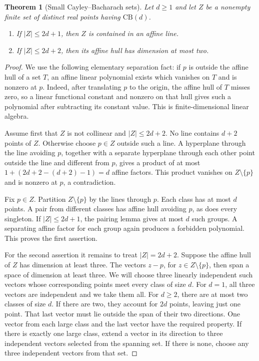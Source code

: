 \documentclass[11pt]{article}
\newtheorem{theorem}{Theorem}
\begin{document}
\begin{theorem}[Small Cayley--Bacharach sets]
Let $d\ge1$ and let $Z$ be a nonempty finite set of distinct real
points having $\mathrm{CB}(d)$.
\begin{enumerate}
\item If $|Z|\le2d+1$, then $Z$ is contained in an affine line.
\item If $|Z|\le2d+2$, then its affine hull has dimension at most two.
\end{enumerate}
\end{theorem}
\begin{proof}
We use the following elementary separation fact: if $p$ is outside the
affine hull of a set $T$, an affine linear polynomial exists which
vanishes on $T$ and is nonzero at $p$. Indeed, after translating $p$
to the origin, the affine hull of $T$ misses zero, so a linear functional
constant and nonzero on that hull gives such a polynomial after
subtracting its constant value. This is finite-dimensional linear
algebra.

Assume first that $Z$ is not collinear and $|Z|\le2d+2$.
No line contains $d+2$ points of $Z$. Otherwise choose $p\in Z$
outside such a line. A hyperplane through the line avoiding $p$,
together with a separate hyperplane through each other point outside
the line and different from $p$, gives a product of at most
$1+(2d+2-(d+2)-1)=d$ affine factors. This product vanishes on
$Z\setminus\{p\}$ and is nonzero at $p$, a contradiction.

Fix $p\in Z$. Partition $Z\setminus\{p\}$ by the lines through $p$.
Each class has at most $d$ points. A pair from different classes has
affine hull avoiding $p$, as does every singleton. If $|Z|\le2d+1$,
the pairing lemma gives at most $d$ such groups. A separating affine
factor for each group again produces a forbidden polynomial. This
proves the first assertion.

For the second assertion it remains to treat $|Z|=2d+2$. Suppose
the affine hull of $Z$ has dimension at least three. The vectors
$z-p$, for $z\in Z\setminus\{p\}$, then span a space of dimension
at least three. We will choose three linearly independent such vectors
whose corresponding points meet every class of size $d$.
For $d=1$, all three vectors are independent and we take them all.
For $d\ge2$, there are at most two classes of size $d$.
If there are two, they account for $2d$ points, leaving just one point.
That last vector must lie outside the span of their two directions.
One vector from each large class and the last vector have the required
property. If there is exactly one large class, extend a vector in its
direction to three independent vectors selected from the spanning set.
If there is none, choose any three independent vectors from that set.


\end{proof}
\end{document}
